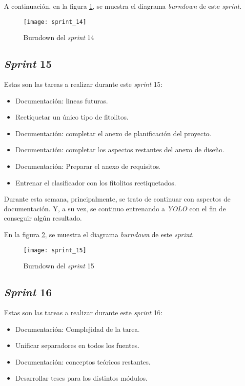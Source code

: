 A continuación, en la figura \ref{fig:A.1.15}, se muestra el diagrama \textit{burndown} de este \textit{sprint}.

\begin{figure}
\centering
\texttt{[image: sprint\_14]}
\caption{Burndown del \textit{sprint} 14}
\label{fig:A.1.15}
\end{figure}

\subsection{\textit{Sprint} 15}

Estas son las tareas a realizar durante este \textit{sprint} 15:

\begin{itemize}
	\item Documentación: lineas futuras.
	\item Reetiquetar un único tipo de fitolitos.
	\item Documentación: completar el anexo de planificación del proyecto.
	\item Documentación: completar los aspectos restantes del anexo de diseño.
	\item Documentación: Preparar el anexo de requisitos.
	\item Entrenar el clasificador con los fitolitos reetiquetados.
\end{itemize}

Durante esta semana, principalmente, se trato de continuar con aspectos de documentación. Y, a su vez, se continuo entrenando a \textit{YOLO} con el fin de conseguir algún resultado. 

En la figura \ref{fig:A.1.16}, se muestra el diagrama \textit{burndown} de este \textit{sprint}.

\begin{figure}
\centering
\texttt{[image: sprint\_15]}
\caption{Burndown del \textit{sprint} 15}
\label{fig:A.1.16}
\end{figure}

\subsection{\textit{Sprint} 16}

Estas son las tareas a realizar durante este \textit{sprint} 16:

\begin{itemize}
	\item Documentación: Complejidad de la tarea.
	\item Unificar separadores en todos los fuentes.
	\item Documentación: conceptos teóricos restantes.
	\item Desarrollar teses para los distintos módulos.
\end{itemize}

